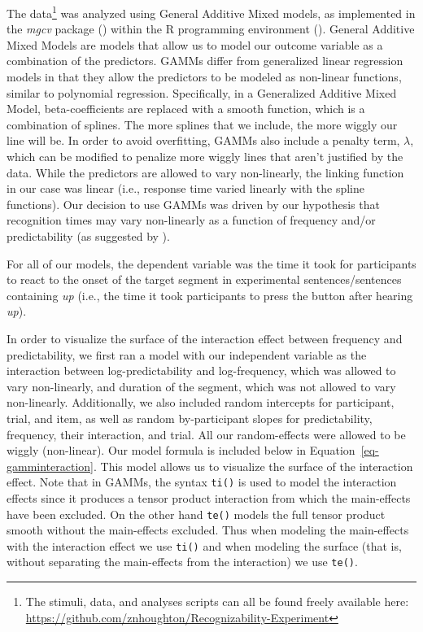 \documentclass[
  12pt,
  letterpaper,
]{scrreprt}
\begin{document}
The data\footnote{The stimuli, data, and analyses scripts can all be
  found freely available here:
  \url{https://github.com/znhoughton/Recognizability-Experiment}} was
analyzed using General Additive Mixed models, as implemented in the
\emph{mgcv} package () within the
R programming environment ().
General Additive Mixed Models are models that allow us to model our
outcome variable as a combination of the predictors. GAMMs differ from
generalized linear regression models in that they allow the predictors
to be modeled as non-linear functions, similar to polynomial regression.
Specifically, in a Generalized Additive Mixed Model, beta-coefficients
are replaced with a smooth function, which is a combination of splines.
The more splines that we include, the more wiggly our line will be. In
order to avoid overfitting, GAMMs also include a penalty term,
\(\lambda\), which can be modified to penalize more wiggly lines that
aren't justified by the data. While the predictors are allowed to vary
non-linearly, the linking function in our case was linear (i.e.,
response time varied linearly with the spline functions). Our decision
to use GAMMs was driven by our hypothesis that recognition times may
vary non-linearly as a function of frequency and/or predictability (as
suggested by
).

For all of our models, the dependent variable was the time it took for
participants to react to the onset of the target segment in experimental
sentences/sentences containing \emph{up} (i.e., the time it took
participants to press the button after hearing \emph{up}).

In order to visualize the surface of the interaction effect between
frequency and predictability, we first ran a model with our independent
variable as the interaction between log-predictability and
log-frequency, which was allowed to vary non-linearly, and duration of
the segment, which was not allowed to vary non-linearly. Additionally,
we also included random intercepts for participant, trial, and item, as
well as random by-participant slopes for predictability, frequency,
their interaction, and trial. All our random-effects were allowed to be
wiggly (non-linear). Our model formula is included below in
Equation~\ref{eq-gamminteraction}. This model allows us to visualize the
surface of the interaction effect. Note that in GAMMs, the syntax
\texttt{ti()} is used to model the interaction effects since it produces
a tensor product interaction from which the main-effects have been
excluded. On the other hand \texttt{te()} models the full tensor product
smooth without the main-effects excluded. Thus when modeling the
main-effects with the interaction effect we use \texttt{ti()} and when
modeling the surface (that is, without separating the main-effects from
the interaction) we use \texttt{te()}.
\end{document}
